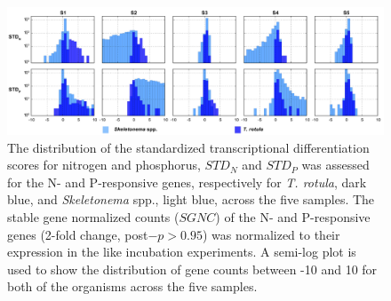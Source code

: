 \begin{landscape}
   \centering
   \null         %
   \vfill        %

	\begin{figure}
  	\centering
    	\includegraphics[width=1.3\textwidth]{Images/C3_STD_Histograms.pdf}
    	\caption[Distribution of $STD$ scores for N- and P-responsive genes]{The distribution of the standardized transcriptional differentiation scores for nitrogen and phosphorus, $STD_N$ and $STD_P$ was assessed for the N- and P-responsive genes, respectively for \textit{T. rotula}, dark blue, and \textit{Skeletonema} spp., light blue, across the five samples. The stable gene normalized counts ($SGNC$) of the N- and P-responsive genes (2-fold change, post$-p > 0.95$) was normalized to their expression in the like incubation experiments. A semi-log plot is used to show the distribution of gene counts between -10 and 10 for both of the organisms across the five samples.}
  	\label{fig:a3f9}
	\end{figure}
    \vfill        %
\end{landscape}



